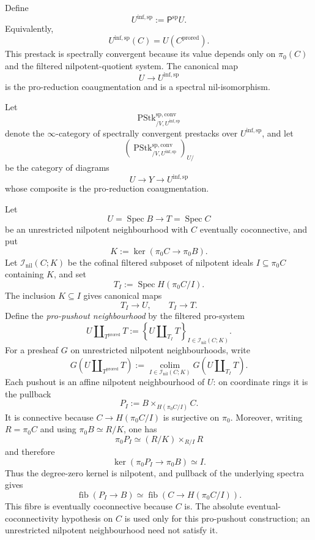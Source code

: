 \begin{definition}
\label{def:bnli-inf-prestack}
Define
\[
\boxed{
    U^{\mathrm{inf,sp}}
    :=
    \mathsf P^{\mathrm{sp}}U.}
\]
Equivalently,
\[
    U^{\mathrm{inf,sp}}(C)
    =
    U(C^{\mathrm{prored}}).
\]
This prestack is spectrally convergent because its value depends only on
$\pi_0(C)$ and the filtered nilpotent-quotient system.  The canonical map
\[
    U\longrightarrow U^{\mathrm{inf,sp}}
\]
is the pro-reduction coaugmentation and is a spectral nil-isomorphism.
\end{definition}

Let
\[
    \operatorname{PStk}^{\mathrm{sp,conv}}_{/V,U^{\mathrm{inf,sp}}}
\]
denote the $\infty$-category of spectrally convergent prestacks over
$U^{\mathrm{inf,sp}}$, and let
\[
    \left(
      \operatorname{PStk}^{\mathrm{sp,conv}}_{/V,U^{\mathrm{inf,sp}}}
    \right)_{U/}
\]
be the category of diagrams
\[
    U\longrightarrow Y\longrightarrow U^{\mathrm{inf,sp}}
\]
whose composite is the pro-reduction coaugmentation.

\begin{definition}
\label{def:bnli-pro-pushout}
Let
\[
    U=\operatorname{Spec}B
    \longrightarrow
    T=\operatorname{Spec}C
\]
be an unrestricted nilpotent neighbourhood with $C$ eventually
coconnective, and put
\[
    K:=\ker(\pi_0C\to\pi_0B).
\]
Let $\mathcal I_{\mathrm{nil}}(C;K)$ be the cofinal filtered subposet of
nilpotent ideals $I\subseteq\pi_0C$ containing $K$, and set
\[
    T_I:=\operatorname{Spec}H(\pi_0C/I).
\]
The inclusion $K\subseteq I$ gives canonical maps
\[
    T_I\longrightarrow U,
    \qquad
    T_I\longrightarrow T.
\]
Define the \emph{pro-pushout neighbourhood} by the filtered pro-system
\[
\boxed{
    U\amalg_{T^{\mathrm{prored}}}T
    :=
    \left\{
      U\amalg_{T_I}T
    \right\}_{I\in\mathcal I_{\mathrm{nil}}(C;K)}.}
\]
For a presheaf $G$ on unrestricted nilpotent neighbourhoods, write
\[
\boxed{
    G(U\amalg_{T^{\mathrm{prored}}}T)
    :=
    \operatorname*{colim}_{I\in\mathcal I_{\mathrm{nil}}(C;K)}
    G(U\amalg_{T_I}T).}
\]
Each pushout is an affine nilpotent neighbourhood of $U$: on coordinate
rings it is the pullback
\[
    P_I
    :=
    B\times_{H(\pi_0C/I)}C.
\]
It is connective because $C\to H(\pi_0C/I)$ is surjective on $\pi_0$.
Moreover, writing $R=\pi_0C$ and using
$\pi_0B\simeq R/K$, one has
\[
    \pi_0P_I
    \simeq
    (R/K)\times_{R/I}R
\]
and therefore
\[
\boxed{
    \ker(\pi_0P_I\to\pi_0B)
    \simeq I.}
\]
Thus the degree-zero kernel is nilpotent, and pullback of the underlying
spectra gives
\[
    \operatorname{fib}(P_I\to B)
    \simeq
    \operatorname{fib}
    \left(
      C\to H(\pi_0C/I)
    \right).
\]
This fibre is eventually coconnective because $C$ is.  The absolute
eventual-coconnectivity hypothesis on $C$ is used only for this pro-pushout
construction; an unrestricted nilpotent neighbourhood need not satisfy it.
\end{definition}




